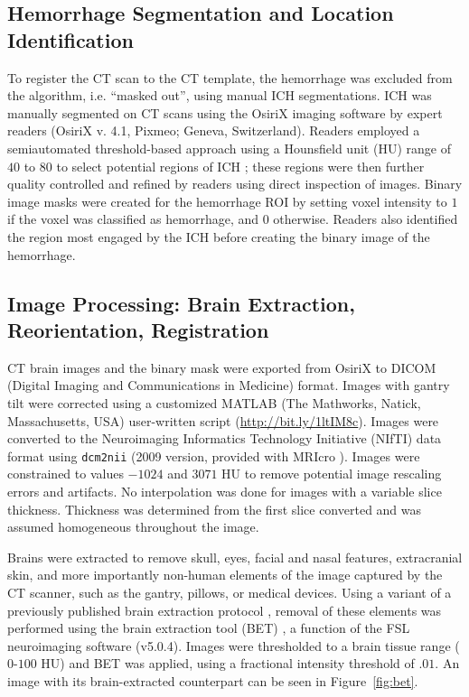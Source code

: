 \documentclass[10pt]{article}\usepackage[]{graphicx}\usepackage[]{color}
\begin{document}
\subsection{Hemorrhage Segmentation and Location Identification}
To register the CT scan to the CT template, the hemorrhage was excluded from the algorithm, i.e. ``masked out'', using manual ICH segmentations.  ICH was manually segmented on CT scans using the OsiriX imaging software by expert readers (OsiriX v. 4.1, Pixmeo; Geneva, Switzerland).  Readers employed a semiautomated threshold-based approach using a Hounsfield unit (HU) range of $40$ to $80$ to select potential regions of ICH \citep{bergstrom_variation_1977, smith_imaging_2006}; these regions were then further quality controlled and refined by readers using direct inspection of images.  Binary image masks were created for the hemorrhage ROI by setting voxel intensity to $1$ if the voxel was classified as hemorrhage, and $0$ otherwise.  Readers also identified the region most engaged by the ICH before creating the binary image of the hemorrhage.

\subsection{Image Processing: Brain Extraction, Reorientation, Registration}
CT brain images and the binary mask were exported from OsiriX to DICOM (Digital Imaging and Communications in Medicine) format.  Images with gantry tilt were corrected using a customized MATLAB (The Mathworks, Natick, Massachusetts, USA) user-written script ({\scriptsize \url{http://bit.ly/1ltIM8c}}). 
Images were converted to the Neuroimaging Informatics Technology Initiative (NIfTI) data format using \verb|dcm2nii| (2009 version, provided with MRIcro \citep{rorden_stereotaxic_2000}).  Images were constrained to values $-1024$ and $3071$ HU to remove potential image rescaling errors and artifacts.  No interpolation was done for images with a variable slice thickness. Thickness was determined from the first slice converted and was assumed homogeneous throughout the image.  

Brains were extracted to remove skull, eyes, facial and nasal features, extracranial skin, and more importantly non-human elements of the image captured by the CT scanner, such as the gantry, pillows, or medical devices.  Using a variant of a previously published brain extraction protocol \citep{rorden_age-specific_2012}, removal of these elements was performed using the brain extraction tool (BET) \citep{smith_fast_2002}, a function of the FSL \citep{jenkinson_fsl_2012} neuroimaging software (v5.0.4).  Images were thresholded to a brain tissue range ($0$-$100$ HU) and BET was applied, using a fractional intensity threshold of $.01$.  An image with its brain-extracted counterpart can be seen in Figure~\ref{fig:bet}.  
\end{document}
